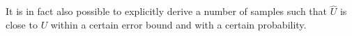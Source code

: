 {It is in fact also possible to explicitly derive a number of samples 
such that $\hat{U}$ is close to $U$ within a certain error bound
and with a certain probability. 
}













